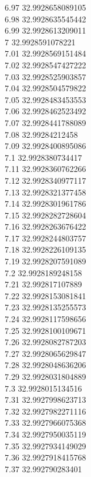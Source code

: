 {6.97	32.9928658089105\\
6.98	32.9928635545442\\
6.99	32.9928613209011\\
7	32.9928591078221\\
7.01	32.9928569151484\\
7.02	32.9928547427222\\
7.03	32.9928525903857\\
7.04	32.9928504579822\\
7.05	32.9928483453553\\
7.06	32.9928462523492\\
7.07	32.9928441788089\\
7.08	32.99284212458\\
7.09	32.9928400895086\\
7.1	32.9928380734417\\
7.11	32.9928360762266\\
7.12	32.9928340977117\\
7.13	32.9928321377458\\
7.14	32.9928301961786\\
7.15	32.9928282728604\\
7.16	32.9928263676422\\
7.17	32.9928244803757\\
7.18	32.9928226109135\\
7.19	32.9928207591089\\
7.2	32.9928189248158\\
7.21	32.992817107889\\
7.22	32.9928153081841\\
7.23	32.9928135255573\\
7.24	32.9928117598656\\
7.25	32.9928100109671\\
7.26	32.9928082787203\\
7.27	32.9928065629847\\
7.28	32.9928048636206\\
7.29	32.9928031804889\\
7.3	32.9928015134516\\
7.31	32.9927998623713\\
7.32	32.9927982271116\\
7.33	32.9927966075368\\
7.34	32.9927950035119\\
7.35	32.9927934149029\\
7.36	32.9927918415768\\
7.37	32.992790283401\\
}
